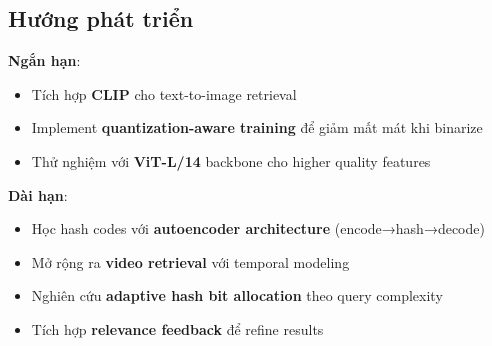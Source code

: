\documentclass[12pt,a4paper]{article}
\begin{document}
\subsection{Hướng phát triển}

\textbf{Ngắn hạn}:
\begin{itemize}
    \item Tích hợp \textbf{CLIP} \cite{radford2021clip} cho text-to-image retrieval
    \item Implement \textbf{quantization-aware training} để giảm mất mát khi binarize
    \item Thử nghiệm với \textbf{ViT-L/14} backbone cho higher quality features
\end{itemize}

\textbf{Dài hạn}:
\begin{itemize}
    \item Học hash codes với \textbf{autoencoder architecture} (encode→hash→decode)
    \item Mở rộng ra \textbf{video retrieval} với temporal modeling
    \item Nghiên cứu \textbf{adaptive hash bit allocation} theo query complexity
    \item Tích hợp \textbf{relevance feedback} để refine results
\end{itemize}

\end{document}
